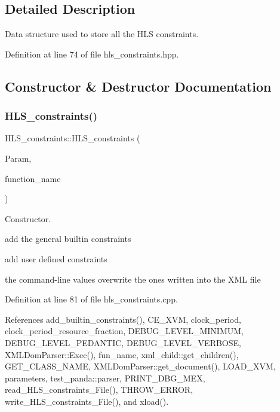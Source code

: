 \subsection{Detailed Description}
Data structure used to store all the H\+LS constraints. 

Definition at line 74 of file hls\+\_\+constraints.\+hpp.



\subsection{Constructor \& Destructor Documentation}
\mbox{\label{classHLS__constraints_a53af44c5158085582b41f0ad2c6763bf}} 
\subsubsection{\texorpdfstring{H\+L\+S\+\_\+constraints()}{HLS\_constraints()}}
{\footnotesize\ttfamily H\+L\+S\+\_\+constraints\+::\+H\+L\+S\+\_\+constraints (\begin{DoxyParamCaption}\item[{const \hyperlink{Parameter_8hpp_a37841774a6fcb479b597fdf8955eb4ea}{Parameter\+Const\+Ref} \&}]{Param,  }\item[{std\+::string}]{function\+\_\+name }\end{DoxyParamCaption})}



Constructor. 

add the general builtin constraints

add user defined constraints

the command-\/line values overwrite the ones written into the X\+ML file 

Definition at line 81 of file hls\+\_\+constraints.\+cpp.



References add\+\_\+builtin\+\_\+constraints(), C\+E\+\_\+\+X\+VM, clock\+\_\+period, clock\+\_\+period\+\_\+resource\+\_\+fraction, D\+E\+B\+U\+G\+\_\+\+L\+E\+V\+E\+L\+\_\+\+M\+I\+N\+I\+M\+UM, D\+E\+B\+U\+G\+\_\+\+L\+E\+V\+E\+L\+\_\+\+P\+E\+D\+A\+N\+T\+IC, D\+E\+B\+U\+G\+\_\+\+L\+E\+V\+E\+L\+\_\+\+V\+E\+R\+B\+O\+SE, X\+M\+L\+Dom\+Parser\+::\+Exec(), fun\+\_\+name, xml\+\_\+child\+::get\+\_\+children(), G\+E\+T\+\_\+\+C\+L\+A\+S\+S\+\_\+\+N\+A\+ME, X\+M\+L\+Dom\+Parser\+::get\+\_\+document(), L\+O\+A\+D\+\_\+\+X\+VM, parameters, test\+\_\+panda\+::parser, P\+R\+I\+N\+T\+\_\+\+D\+B\+G\+\_\+\+M\+EX, read\+\_\+\+H\+L\+S\+\_\+constraints\+\_\+\+File(), T\+H\+R\+O\+W\+\_\+\+E\+R\+R\+OR, write\+\_\+\+H\+L\+S\+\_\+constraints\+\_\+\+File(), and xload().

